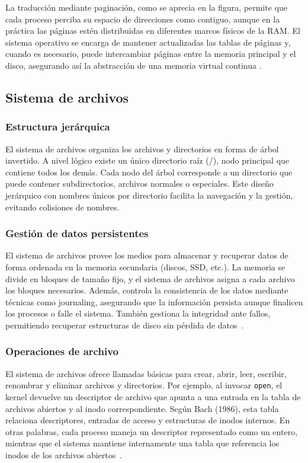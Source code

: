La traducción mediante paginación, como se aprecia en la figura, permite que cada proceso perciba su espacio de direcciones como contiguo, aunque en la práctica las páginas estén distribuidas en diferentes marcos físicos de la RAM. El sistema operativo se encarga de mantener actualizadas las tablas de páginas y, cuando es necesario, puede intercambiar páginas entre la memoria principal y el disco, asegurando así la abstracción de una memoria virtual continua \citep{ucm2020}.  
\subsection{Sistema de archivos}

\subsubsection{Estructura jerárquica}
El sistema de archivos organiza los archivos y directorios en forma de árbol invertido. A nivel lógico existe un único directorio raíz (/), 
nodo principal que contiene todos los demás. Cada nodo del árbol corresponde a un directorio que puede contener subdirectorios, archivos normales o especiales.
Este diseño jerárquico con nombres únicos por directorio facilita la navegación y la gestión, evitando colisiones de nombres.

\subsubsection{Gestión de datos persistentes}
El sistema de archivos provee los medios para almacenar y recuperar datos de forma ordenada en la memoria secundaria (discos, SSD, etc.). 
La memoria se divide en bloques de tamaño fijo, y el sistema de archivos asigna a cada archivo los bloques necesarios. 
Además, controla la consistencia de los datos mediante técnicas como journaling, asegurando que la información persista aunque finalicen los procesos o falle el sistema. 
También gestiona la integridad ante fallos, permitiendo recuperar estructuras de disco sin pérdida de datos~\citep{ual2019}.

\subsubsection{Operaciones de archivo}
El sistema de archivos ofrece llamadas básicas para crear, abrir, leer, escribir, renombrar y eliminar archivos y directorios. 
Por ejemplo, al invocar \texttt{open}, el kernel devuelve un descriptor de archivo que apunta a una entrada en la tabla de archivos abiertos y al inodo correspondiente. 
Según Bach (1986), esta tabla relaciona descriptores, entradas de acceso y estructuras de inodos internos. 
En otras palabras, cada proceso maneja un descriptor representado como un entero, mientras que el sistema mantiene internamente una tabla que referencia los inodos de los archivos abiertos~\citep{ual2019}.

